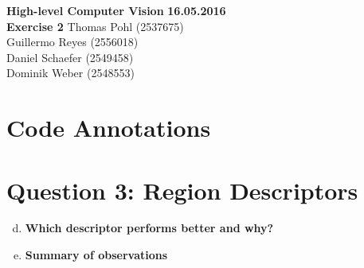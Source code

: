 \documentclass[12pt]{article}
\begin{document}

\noindent
{\Large \textbf{High-level Computer Vision}} \hfill \textbf{16.05.2016}\\
{\Large \textbf{Exercise 2}} \hfill Thomas Pohl (2537675)\\
\raggedleft \hfill Guillermo Reyes (2556018)\\
\hfill Daniel Schaefer (2549458)\\
\hfill Dominik Weber (2548553)\\

\raggedright


\section*{Code Annotations}




\section*{Question 3: Region Descriptors}

\begin{enumerate}[a)]
	\setcounter{enumi}{3}
	\item 	
	\textbf{Which descriptor performs better and why?}\\
	
	\item
	\textbf{Summary of observations}\\

\end{enumerate}
\end{document}

